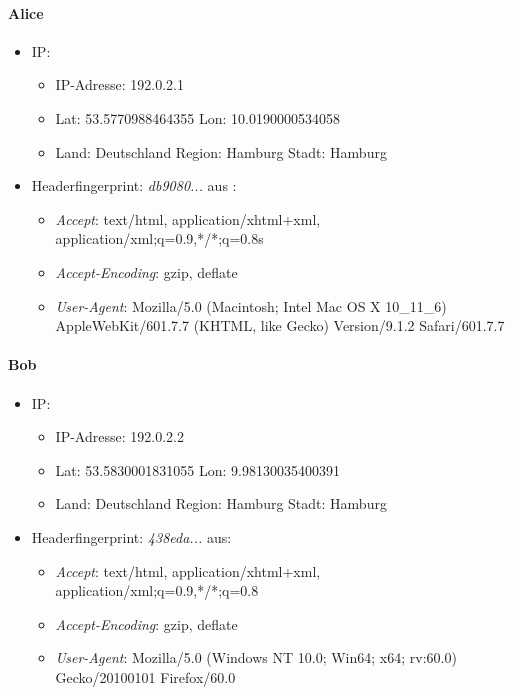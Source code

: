 \documentclass[
    fontsize=12pt,
    headings=small,
    parskip=half,           %
    bibliography=totoc,
    numbers=noenddot,       %
    open=any,               %
    ]{scrreprt}
\begin{document}
\paragraph{Alice}
\begin{itemize}
  \item IP: 
  \begin{itemize}
  \item IP-Adresse: 192.0.2.1
  \item \ac{Lat}: 53.5770988464355 \ac{Lon}: 10.0190000534058
  \item Land: Deutschland Region: Hamburg Stadt: Hamburg
  \end{itemize}
  \item Headerfingerprint: \textit{db9080...} aus :
  \begin{itemize}
  \item \textit{Accept}: text/html, application/xhtml+xml, application/xml;q=0.9,*/*;q=0.8s
  \item \textit{Accept-Encoding}: gzip, deflate
  \item \textit{User-Agent}: Mozilla/5.0 (Macintosh; Intel Mac OS X 10\_11\_6) AppleWebKit/601.7.7 (KHTML, like Gecko) Version/9.1.2 Safari/601.7.7
  \end{itemize}
\end{itemize}

\paragraph{Bob}
\begin{itemize}
  \item IP: 
  \begin{itemize}
  \item IP-Adresse: 192.0.2.2
  \item \ac{Lat}: 53.5830001831055 \ac{Lon}: 9.98130035400391
  \item Land: Deutschland Region: Hamburg Stadt: Hamburg
  \end{itemize}
  \item Headerfingerprint: \textit{438eda...} aus:
  \begin{itemize}
  \item \textit{Accept}: text/html, application/xhtml+xml, application/xml;q=0.9,*/*;q=0.8
  \item \textit{Accept-Encoding}: gzip, deflate
  \item \textit{User-Agent}: Mozilla/5.0 (Windows NT 10.0; Win64; x64; rv:60.0) Gecko/20100101 Firefox/60.0
  \end{itemize}
\end{itemize}
\end{document}

